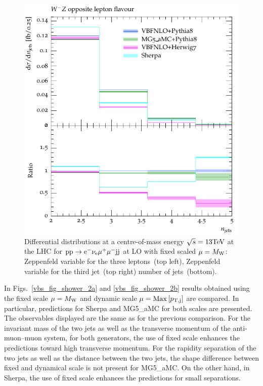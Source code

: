 \documentclass[11pt]{cernrep}
\begin{document}
\begin{figure}[htbp]
\begin{center}
   \includegraphics[scale=0.65]{figs/VBFNLO_WmZ_OF_nJets}
\caption{Differential distributions at a centre-of-mass energy $\sqrt{s}=13{\rm TeV}$ at the LHC for ${\rm p} {\rm p}
  \to {\rm e}^-  \nu_{\rm e}  \mu^+ \mu^- {\rm j} {\rm j}$ at LO with fixed scaled $\mu = M_{\rm W}$: 
                Zeppenfeld variable for the three leptons~(top left),
                Zeppenfeld variable for the third jet~(top right)
                number of jets~(bottom).
                }
\label{vbs_fig_shower_1b}
\end{center}
\end{figure}

In Figs.~\ref{vbs_fig_shower_2a} and \ref{vbs_fig_shower_2b} results obtained using the fixed scale $\mu = M_{\rm W}$ and dynamic scale $\mu = {\rm Max}\left[p_{\rm T, j}\right]$ are compared.
In particular, predictions for {\sc Sherpa} and {\sc MG5\_aMC} for both scales are presented.
The observables displayed are the same as for the previous comparison.
For the invariant mass of the two jets as well as the transverse momentum of the anti-muon--muon system, for both generators, the use of fixed scale enhances the predictions toward high transverse momentum.
For the rapidity separation of the two jets as well as the distance between the two jets, the shape difference between fixed and dynamical scale is not present for {\sc MG5\_aMC}.
On the other hand, in {\sc Sherpa}, the use of fixed scale enhances the predictions for small separations.
\end{document}
